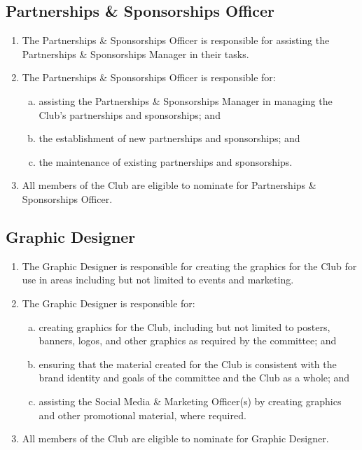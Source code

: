 \documentclass{schedule}
\begin{document}
\subsection{Partnerships \& Sponsorships Officer}
\begin{enumerate}[(1)]
    \item The Partnerships \& Sponsorships Officer is responsible for assisting the Partnerships \& Sponsorships Manager in their tasks.
    \item The Partnerships \& Sponsorships Officer is responsible for:
          \begin{enumerate}[(a)]
              \item assisting the Partnerships \& Sponsorships Manager in managing the Club's partnerships and sponsorships; and
              \item the establishment of new partnerships and sponsorships; and
              \item the maintenance of existing partnerships and sponsorships.
          \end{enumerate}
    \item All members of the Club are eligible to nominate for Partnerships \& Sponsorships Officer.
\end{enumerate}

\subsection{Graphic Designer}
\begin{enumerate}[(1)]
    \item The Graphic Designer is responsible for creating the graphics for the Club for use in areas including but not limited to events and marketing.
    \item The Graphic Designer is responsible for:
          \begin{enumerate}[(a)]
              \item creating graphics for the Club, including but not limited to posters, banners, logos, and other graphics as required by the committee; and
              \item ensuring that the material created for the Club is consistent with the brand identity and goals of the committee and the Club as a whole; and
              \item assisting the Social Media \& Marketing Officer(s) by creating graphics and other promotional material, where required.
          \end{enumerate}
    \item All members of the Club are eligible to nominate for Graphic Designer.
\end{enumerate}
\end{document}
